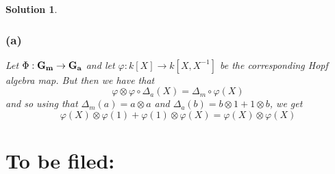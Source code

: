 \documentclass[12pt]{article}
\theoremstyle{nonumberbreak}
\newtheorem{sol}{Solution}
\theoremstyle{changebreak}
\theoremstyle{nonumberplain}
\theoremstyle{change}
\newcommand{\Ga}{\ensuremath\mathbf{G_a}}
\newcommand{\Gm}{\ensuremath\mathbf{G_m}}
\begin{document}
\begin{sol}
	\subsubsection*{(a)}
	Let $\Phi:\Gm\to\Ga$ and let $\varphi:k[X]\to k[X,X^{-1}]$ be the corresponding Hopf
	algebra map. But then we have that 
	\[\varphi\otimes\varphi \circ \Delta_a(X)=\Delta_m\circ\varphi(X)\]
	and so using that $\Delta_m(a)=a\otimes a$ and $\Delta_a(b)=b\otimes1+1\otimes b$, we get
	\[\varphi(X)\otimes\varphi(1)+\varphi(1)\otimes\varphi(X)=\varphi(X)\otimes\varphi(X)\]
	
\end{sol}



\section{To be filed:}
\end{document}
